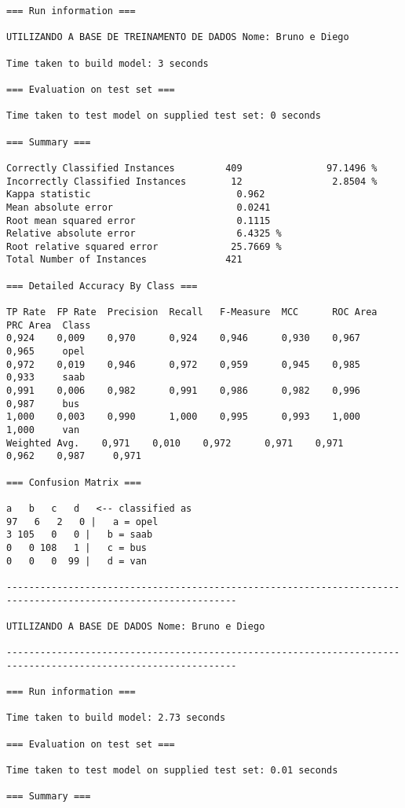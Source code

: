 \documentclass[
	article,			%
	11pt,				%
	oneside,			%
	a4paper,			%
	english,			%
	brazil,				%
	sumario=tradicional
	]{abntex2}
\begin{document}
\begin{lstlisting}
=== Run information ===

UTILIZANDO A BASE DE TREINAMENTO DE DADOS Nome: Bruno e Diego

Time taken to build model: 3 seconds

=== Evaluation on test set ===

Time taken to test model on supplied test set: 0 seconds

=== Summary ===

Correctly Classified Instances         409               97.1496 %
Incorrectly Classified Instances        12                2.8504 %
Kappa statistic                          0.962 
Mean absolute error                      0.0241
Root mean squared error                  0.1115
Relative absolute error                  6.4325 %
Root relative squared error             25.7669 %
Total Number of Instances              421     

=== Detailed Accuracy By Class ===

TP Rate  FP Rate  Precision  Recall   F-Measure  MCC      ROC Area  PRC Area  Class
0,924    0,009    0,970      0,924    0,946      0,930    0,967     0,965     opel
0,972    0,019    0,946      0,972    0,959      0,945    0,985     0,933     saab
0,991    0,006    0,982      0,991    0,986      0,982    0,996     0,987     bus
1,000    0,003    0,990      1,000    0,995      0,993    1,000     1,000     van
Weighted Avg.    0,971    0,010    0,972      0,971    0,971      0,962    0,987     0,971     

=== Confusion Matrix ===

a   b   c   d   <-- classified as
97   6   2   0 |   a = opel
3 105   0   0 |   b = saab
0   0 108   1 |   c = bus
0   0   0  99 |   d = van

---------------------------------------------------------------------------------------------------------------

UTILIZANDO A BASE DE DADOS Nome: Bruno e Diego

---------------------------------------------------------------------------------------------------------------

=== Run information ===

Time taken to build model: 2.73 seconds

=== Evaluation on test set ===

Time taken to test model on supplied test set: 0.01 seconds

=== Summary ===


\end{lstlisting}
\end{document}
